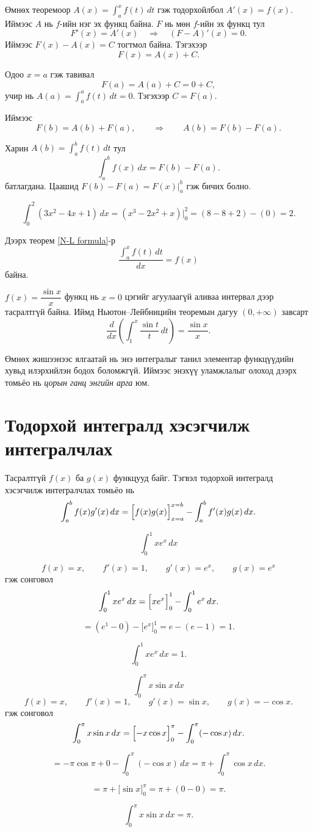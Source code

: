 \begin{prof}
Өмнөх теоремоор $\displaystyle A(x)=\int_a^x f(t)\,dt$ гэж тодорхойлбол $A'(x)=f(x)$.
Иймээс $A$ нь $f$-ийн нэг эх функц байна. $F$ нь мөн $f$-ийн эх функц тул 
\[
F'(x)=A'(x)
\quad\Rightarrow\quad
(F-A)'(x)=0.
\]
Иймээс $F(x)-A(x)=C$ тогтмол байна. Тэгэхээр
\[
F(x)=A(x)+C.
\]

Одоо $x=a$ гэж тавивал
\[
F(a)=A(a)+C = 0 + C,
\]
учир нь $A(a)=\displaystyle\int_a^a f(t)\,dt =0$. Тэгэхээр $C=F(a)$.

Иймээс
\[
F(b)=A(b)+F(a),
\qquad\Rightarrow\qquad
A(b)=F(b)-F(a).
\]

Харин $A(b)=\displaystyle\int_a^b f(t)\,dt$ тул 
\[
\int_a^b f(x)\,dx = F(b)-F(a).
\] батлагдана. Цаашид $F(b)-F(a)=F(x)\Big|_a^b$ гэж бичих болно.
\end{prof}
\begin{example}
\[
\int_0^2 (3x^2-4x+1)\,dx
=
\left(x^3-2x^2+x\right)\Big|_0^2
= (8-8+2)-(0)=2.
\]
\end{example}
Дээрх теорем \ref{N-L formula}-р $$\dfrac{\displaystyle\int_a^x f(t)\,dt}{dx}=f(x)$$ байна. 
\begin{example}
$f(x)=\dfrac{\sin x}{x}$ функц нь $x=0$ цэгийг агуулаагүй аливаа интервал дээр тасралтгүй байна. Иймд Ньютон–Лейбницийн теоремын дагуу $(0,+\infty)$ завсарт
\[
\frac{d}{dx}\left(\int_{1}^{x} \frac{\sin t}{t}\,dt\right)=\frac{\sin x}{x}.
\]

Өмнөх жишээнээс ялгаатай нь энэ интегралыг танил элементар функцүүдийн хувьд илэрхийлэн бодох боломжгүй. Иймээс энэхүү уламжлалыг олоход дээрх томьёо нь \textit{цорын ганц энгийн арга} юм.
\end{example}
\section{Тодорхой интегралд хэсэгчилж интегралчлах}

Тасралтгүй $f(x)$ ба $g(x)$ функцууд байг. Тэгвэл тодорхой интегралд 
хэсэгчилж интегралчлах томьёо нь
\[
\int_a^b f(x)g'(x)\,dx
=
\Bigl[f(x)g(x)\Bigr]_{x=a}^{x=b}-\int_a^b f'(x)g(x)\,dx .
\]
\begin{example}
\[
\int_0^1 x e^x\,dx
\]
 
\[
f(x)=x,\qquad f'(x)=1,\qquad g'(x)=e^x,\qquad g(x)=e^x
\] гэж сонговол
\[
\int_0^1 x e^x\,dx
=
\Bigl[x e^x\Bigr]_0^1-\int_0^1 e^x\,dx.
\]

\[
=
(e^1-0)-\bigl[e^x\bigr]_0^1
=
e-(e-1)=1.
\]

\[
\boxed{\displaystyle\int_0^1 x e^x\,dx=1.}
\]
\end{example}
\begin{example}
\[
\int_0^\pi x\sin x\,dx
\]
\[
f(x)=x,\qquad f'(x)=1,\qquad g'(x)=\sin x,\qquad g(x)=-\cos x.
\]
гэж сонговол
\[
\int_0^\pi x\sin x\,dx
=
\Bigl[-x\cos x\Bigr]_0^\pi
-
\int_0^\pi (-\cos x)\,dx.
\]

\[
=-\pi\cos\pi+0-\int_0^\pi (-\cos x)\,dx
=\pi+\int_0^\pi \cos x\,dx.
\]

\[
=\pi+\bigl[\sin x\bigr]_0^\pi
=\pi+(0-0)=\pi.
\]

\[
\boxed{\displaystyle\int_0^\pi x\sin x\,dx=\pi.}
\]
    
\end{example}
